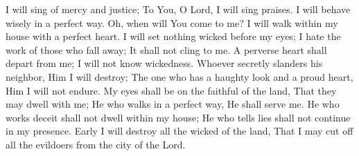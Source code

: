 
I will sing of mercy and justice; To You, O Lord, I will sing praises. I will behave wisely in a perfect way. Oh, when will You come to me? I will walk within my house with a perfect heart. I will set nothing wicked before my eyes; I hate the work of those who fall away; It shall not cling to me. A perverse heart shall depart from me; I will not know wickedness. Whoever secretly slanders his neighbor, Him I will destroy; The one who has a haughty look and a proud heart, Him I will not endure. My eyes shall be on the faithful of the land, That they may dwell with me; He who walks in a perfect way, He shall serve me. He who works deceit shall not dwell within my house; He who tells lies shall not continue in my presence. Early I will destroy all the wicked of the land, That I may cut off all the evildoers from the city of the Lord.
